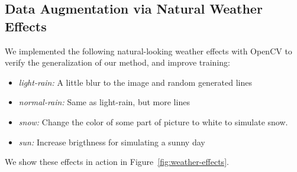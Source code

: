 \subsection{Data Augmentation via Natural Weather Effects}
We implemented the following natural-looking weather effects with OpenCV to
verify the generalization of our method, and improve training:
\begin{itemize}
    \item \emph{light-rain:} A little blur to the image and random generated lines
    \item \emph{normal-rain:} Same as light-rain, but more lines
    \item \emph{snow:} Change the color of some part of picture to white to simulate snow.
    \item \emph{sun:} Increase brigthness for simulating a sunny day
\end{itemize}

We show these effects in action in Figure~\ref{fig:weather-effects}.

